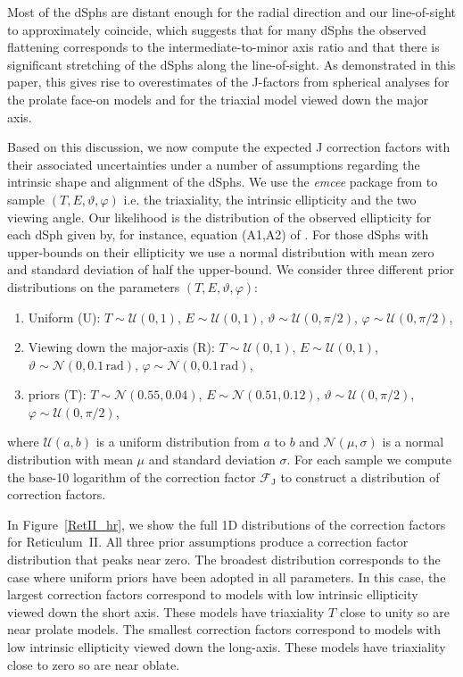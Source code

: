 \documentclass[prd,twocolumn,showpacs,preprintnumbers,superscriptaddress,nofootinbib,amsmath,amssymb,nobalancelastpage]{revtex4}
\begin{document}
Most of the dSphs are distant enough for the radial direction and our line-of-sight to approximately coincide, which suggests that for many dSphs the observed flattening corresponds to the intermediate-to-minor axis ratio and that there is significant stretching of the dSphs along the line-of-sight. As demonstrated in this paper, this gives rise to overestimates of the J-factors from spherical analyses for the prolate face-on models and for the triaxial model viewed down the major axis.

Based on this discussion, we now compute the expected J correction factors with their associated uncertainties under a number of assumptions regarding the intrinsic shape and alignment of the dSphs. We use the \emph{emcee} package from \cite{ForemanMackey2012} to sample $(T,E,\vartheta,\varphi)$ i.e. the triaxiality, the intrinsic ellipticity and the two viewing angle. Our likelihood is the distribution of the observed ellipticity for each dSph given by, for instance, equation (A1,A2) of \cite{Weijmans2014}. For those dSphs with upper-bounds on their ellipticity we use a normal distribution with mean zero and standard deviation of half the upper-bound. We consider three different prior distributions on the parameters $(T,E,\vartheta,\varphi)$:
\begin{enumerate}
\item Uniform (U): $T\sim\mathcal{U}(0,1)$, $E\sim\mathcal{U}(0,1)$, $\vartheta\sim\mathcal{U}(0,\pi/2)$, $\varphi\sim\mathcal{U}(0,\pi/2)$,
\item Viewing down the major-axis (R): $T\sim\mathcal{U}(0,1)$, $E\sim\mathcal{U}(0,1)$, $\vartheta\sim\mathcal{N}(0,0.1\,\mathrm{rad})$, $\varphi\sim\mathcal{N}(0,0.1\,\mathrm{rad})$,
\item \citet{SanchezJanssen2016} priors (T): $T\sim\mathcal{N}(0.55,0.04)$, $E\sim\mathcal{N}(0.51,0.12)$, $\vartheta\sim\mathcal{U}(0,\pi/2)$, $\varphi\sim\mathcal{U}(0,\pi/2)$,
\end{enumerate}
where $\mathcal{U}(a,b)$ is a uniform distribution from $a$ to $b$ and $\mathcal{N}(\mu,\sigma)$ is a normal distribution with mean $\mu$ and standard deviation $\sigma$. For each sample we compute the base-10 logarithm of the correction factor $\mathcal{F}_\mathrm{J}$ to construct a distribution of correction factors.

In Figure~\ref{RetII_hr}, we show the full 1D distributions of the correction factors for Reticulum~II. All three prior assumptions produce a correction factor distribution that peaks near zero. The broadest distribution corresponds to the case where uniform priors have been adopted in all parameters. In this case, the largest correction factors correspond to models with low intrinsic ellipticity viewed down the short axis. These models have triaxiality $T$ close to unity so are near prolate models. The smallest correction factors correspond to models with low intrinsic ellipticity viewed down the long-axis. These models have triaxiality close to zero so are near oblate.
\end{document}
